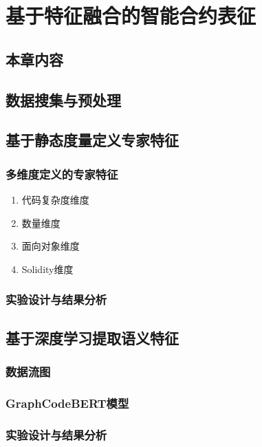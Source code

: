 \chapter{基于特征融合的智能合约表征}
\section{本章内容}

\section{数据搜集与预处理}

\section{基于静态度量定义专家特征}

\subsection{多维度定义的专家特征}
\begin{enumerate}[label=\Alph*., align=left, leftmargin=*]
    \item 代码复杂度维度
    
    \item 数量维度
    
    \item 面向对象维度
    
    \item Solidity维度
    
\end{enumerate}

\subsection{实验设计与结果分析}

\section{基于深度学习提取语义特征}
\subsection{数据流图}

\subsection{GraphCodeBERT模型}

\subsection{实验设计与结果分析}